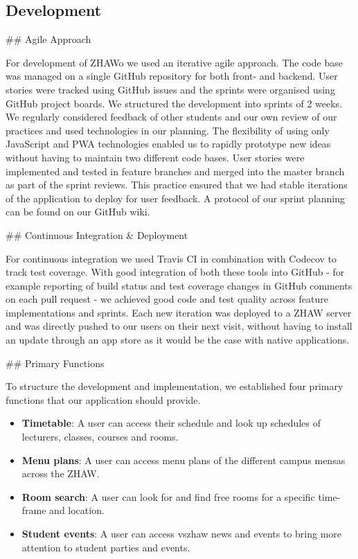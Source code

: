 \begin{markdown}
\section{Development} \label{development}

## Agile Approach

For development of ZHAWo we used an iterative agile approach. The code base was managed on a single GitHub repository \cite{OurGithub} for both front- and backend. User stories were tracked using GitHub issues and the sprints were organised using GitHub project boards. We structured the development into sprints of 2 weeks. We regularly considered feedback of other students and our own review of our practices and used technologies in our planning. The flexibility of using only JavaScript and PWA technologies enabled us to rapidly prototype new ideas without having to maintain two different code bases.
User stories were implemented and tested in feature branches and merged into the master branch as part of the sprint reviews. This practice ensured that we had stable iterations of the application to deploy for user feedback. A protocol of our sprint planning can be found on our GitHub wiki.

## Continuous Integration \& Deployment

For continuous integration we used Travis CI \cite{Travis} in combination with Codecov \cite{Codecov} to track test coverage. With good integration of both these tools into GitHub - for example reporting of build status and test coverage changes in GitHub comments on each pull request - we achieved good code and test quality across feature implementations and sprints.
Each new iteration was deployed to a ZHAW server \cite{OurHost} and was directly pushed to our users on their next visit, without having to install an update through an app store as it would be the case with native applications.

## Primary Functions

To structure the development and implementation, we established four primary functions that our application should provide.

\begin{itemize}
  \item \textbf{Timetable}: A user can access their schedule and look up schedules of lecturers, classes, courses and rooms.
  \item \textbf{Menu plans}: A user can access menu plans of the different campus mensas across the ZHAW.
  \item \textbf{Room search}: A user can look for and find free rooms for a specific time-frame and location.
  \item \textbf{Student events}: A user can access vszhaw news and events to bring more attention to student parties and events.
\end{itemize}


\end{markdown}
